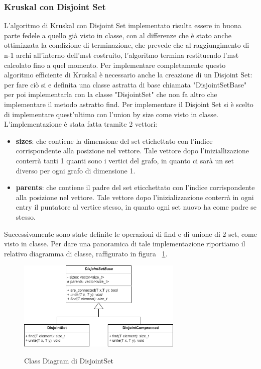 \subsubsection{Kruskal con Disjoint Set}
L'algoritmo di Kruskal con Disjoint Set implementato risulta essere in buona parte fedele a quello già visto in classe, con al differenze che è stato anche ottimizzata la condizione di terminazione, che prevede che al raggiungimento di n-1 archi all'interno dell'mst costruito, l'algoritmo termina restituendo l'mst calcolato fino a quel momento. Per implementare completamente questo algoritmo efficiente di Kruskal è necessario anche la creazione di un Disjoint Set: per fare ciò si e definita una classe astratta di base chiamata "DisjointSetBase" per poi implementarla con la classe "DisjointSet" che non fa altro che implementare il metodo astratto find. Per implementare il Disjoint Set si è scelto di implementare quest'ultimo con l'union by size come visto in classe. L'implementazione è stata fatta tramite 2 vettori:
\begin{itemize}
    \item \textbf{sizes}: che contiene la dimensione del set etichettato con l'indice corrispondente alla posizione nel vettore. Tale vettore dopo l'iniziallizazione conterrà tanti 1 quanti sono i vertici del grafo, in quanto ci sarà un set diverso per ogni grafo di dimensione 1. 
    \item \textbf{parents}: che contiene il padre del set eticchettato con l'indice corrispondente alla posizione nel vettore. Tale vettore dopo l'inizializzazione conterrà in ogni entry il puntatore al vertice stesso, in quanto ogni set nuovo ha come padre se stesso.
\end{itemize}

Successivamente sono state definite le operazioni di find e di unione di 2 set, come visto in classe. Per dare una panoramica di tale implementazione riportiamo il relativo diagramma di classe, raffigurato in figura ~\ref{fig:DisjointSet Class}.

\begin{figure}[h]
	\caption{Class Diagram di DisjointSet}
	\centering
	\includegraphics[width=0.7\textwidth]{./images/DisjointSetClass.png}
	\label{fig:DisjointSet Class}
\end{figure}

